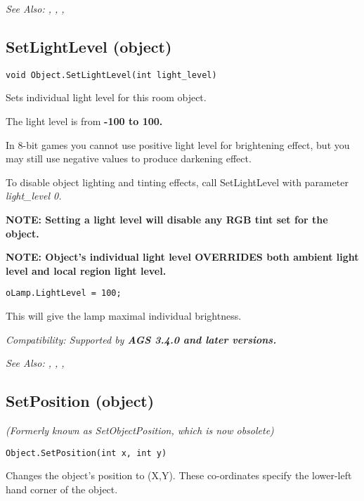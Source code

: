 \it{See Also:} ,
,
,


\subsection{SetLightLevel (object)}\label{Object.SetLightLevel}%

\begin{verbatim}
void Object.SetLightLevel(int light_level)
\end{verbatim}
Sets individual light level for this room object.

The light level is from \bf{-100 to 100}.

In 8-bit games you cannot use positive light level for brightening effect, but you
may still use negative values to produce darkening effect.

To disable object lighting and tinting effects, call SetLightLevel with parameter \it{light_level} 0.

\bf{NOTE}: Setting a light level will disable any RGB tint set for the object.

\bf{NOTE:} Object's individual light level OVERRIDES both ambient light level and local region light level.

\begin{verbatim}
oLamp.LightLevel = 100;
\end{verbatim}
This will give the lamp maximal individual brightness.

\it{Compatibility:} Supported by \bf{AGS 3.4.0} and later versions.

\it{See Also:} ,
,
,


\subsection{SetPosition (object)}\label{Object.SetPosition}%

\it{(Formerly known as SetObjectPosition, which is now obsolete)}

\begin{verbatim}
Object.SetPosition(int x, int y)
\end{verbatim}
Changes the object's position to (X,Y). These co-ordinates specify the lower-left
hand corner of the object.

